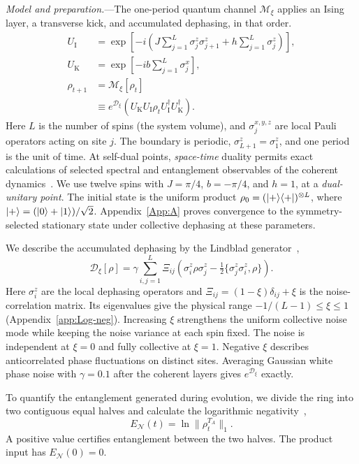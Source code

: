 \documentclass[aps,prl,reprint,amsmath,amssymb,floatfix,superscriptaddress]{revtex4-2}
\newcommand{\UK}{U_{\mathrm K}}
\newcommand{\UI}{U_{\mathrm I}}
\newcommand{\EN}{E_{\mathcal N}}
\begin{document}
\emph{Model and preparation.}---The one-period quantum channel $\mathcal M_\xi$ applies an Ising layer, a transverse kick, and accumulated dephasing, in that order.
\begin{align}
\UI&=\exp\!\left[-i\left(J\sum_{j=1}^{L}\sigma_j^z\sigma_{j+1}^z+h\sum_{j=1}^{L}\sigma_j^z\right)\right],\nonumber\\
\UK&=\exp\!\left[-ib\sum_{j=1}^{L}\sigma_j^x\right],\nonumber\\
\rho_{t+1}&=\mathcal M_\xi[\rho_t]\nonumber\\
&\equiv e^{\mathcal D_\xi}\!\left(\UK\UI\rho_t\UI^\dagger\UK^\dagger\right).
\label{eq:map}
\end{align}
Here $L$ is the number of spins (the system volume), and $\sigma_j^{x,y,z}$ are local Pauli operators acting on site $j$. The boundary is periodic, $\sigma^z_{L+1}=\sigma^z_1$, and one period is the unit of time. At self-dual points, \emph{space-time} duality permits exact calculations of selected spectral and entanglement observables of the coherent dynamics~\cite{Bertini2018,Bertini2019}. We use twelve spins with $J=\pi/4$, $b=-\pi/4$, and $h=1$, at a \emph{dual-unitary point}. The initial state is the uniform product $\rho_0=(\ket{+}\!\bra{+})^{\otimes L}$, where $\ket{+}=(\ket0+\ket1)/\sqrt2$. Appendix~\ref{App:A} proves convergence to the symmetry-selected stationary state under collective dephasing at these parameters.

We describe the accumulated dephasing by the Lindblad generator~\cite{Breuer2007},
\begin{equation}
\mathcal D_\xi[\rho]=\gamma\sum_{i,j=1}^{L}\Xi_{ij}\left(\sigma_i^z\rho\sigma_j^z-\tfrac12\{\sigma_j^z\sigma_i^z,\rho\}\right).
\label{eq:noise}
\end{equation}
Here $\sigma_i^z$ are the local dephasing operators and $\Xi_{ij}=(1-\xi)\delta_{ij}+\xi$ is the noise-correlation matrix. Its eigenvalues give the physical range $-1/(L-1)\le\xi\le1$ (Appendix~\ref{app:Log-neg}). Increasing $\xi$ strengthens the uniform collective noise mode while keeping the noise variance at each spin fixed. The noise is independent at $\xi=0$ and fully collective at $\xi=1$. Negative $\xi$ describes anticorrelated phase fluctuations on distinct sites. Averaging Gaussian white phase noise with $\gamma=0.1$ after the coherent layers gives $e^{\mathcal D_\xi}$ exactly.

To quantify the entanglement generated during evolution, we divide the ring into two contiguous equal halves and calculate the logarithmic negativity~\cite{Vidal2002},
\begin{equation}
\EN(t)=\ln\|\rho_t^{T_A}\|_1.
\label{eq:negativity}
\end{equation}
A positive value certifies entanglement between the two halves. The product input has $\EN(0)=0$.
\end{document}
